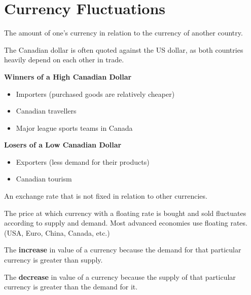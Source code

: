 \section{Currency Fluctuations}

\begin{definition}
    The amount of one's currency in relation to the currency of another country.
\end{definition}

The Canadian dollar is often quoted against the US dollar, as both countries 
heavily depend on each other in trade.

\textbf{Winners of a High Canadian Dollar}
\begin{itemize}
    \item Importers (purchased goods are relatively cheaper)
    \item Canadian travellers
    \item Major league sports teams in Canada
\end{itemize}

\textbf{Losers of a Low Canadian Dollar}
\begin{itemize}
    \item Exporters (less demand for their products)
    \item Canadian tourism
\end{itemize}

\begin{definition}
    An exchange rate that is not fixed in relation to other currencies.
\end{definition}

The price at which currency with a floating rate is bought and sold fluctuates according to supply and demand.
Most advanced economies use floating rates. (USA, Euro, China, Canada, etc.)

\begin{definition}
    The \textbf{increase} in value of a currency because the demand for 
    that particular currency is greater than supply.
\end{definition}

\pagebreak

\begin{definition}
    The \textbf{decrease} in value of a currency because the supply of 
    that particular currency is greater than the demand for it.
\end{definition}

